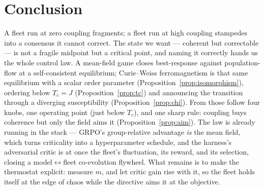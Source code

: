 \documentclass[11pt]{article}
\begin{document}
\section{Conclusion}
\label{sec:conclusion}

A fleet run at zero coupling fragments; a fleet run at high coupling stampedes into a consensus it cannot
correct. The state we want --- coherent but correctable --- is not a fragile midpoint but a critical point, and
naming it correctly hands us the whole control law. A mean-field game closes best-response against
population-flow at a self-consistent equilibrium; Curie--Weiss ferromagnetism is that same equilibrium with a
scalar order parameter (Proposition~\ref{prop:isomorphism}), ordering below $T_c=J$
(Proposition~\ref{prop:tc}) and announcing the transition through a diverging susceptibility
(Proposition~\ref{prop:chi}). From those follow four knobs, one operating point (just below $T_c$), and one
sharp rule: coupling buys coherence but only the field aims it (Proposition~\ref{prop:aim}). The law is already
running in the stack --- GRPO's group-relative advantage \emph{is} the mean field, which turns criticality into
a hyperparameter schedule, and the harness's adversarial critic is at once the fleet's fluctuation, its reward,
and its selection, closing a model$\leftrightarrow$fleet co-evolution flywheel. What remains is to make the
thermostat explicit: measure $m$, and let critic gain rise with it, so the fleet holds itself at the edge of
chaos while the directive aims it at the objective.
\end{document}
